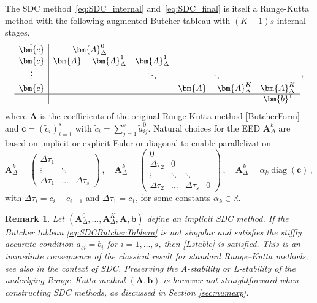 \documentclass[sn-mathphys-num]{sn-jnl}%
\newcommand{\revc}[1]{#1}%
\DeclareMathOperator{\diag}{diag}
\theoremstyle{thmstyleone}%
\theoremstyle{thmstyletwo}%
\newtheorem{remark}{Remark}%
\theoremstyle{thmstylethree}%
\begin{document}
The SDC method~\eqref{eq:SDC_internal} and~\eqref{eq:SDC_final} is itself a Runge-Kutta method with the following augmented Butcher tableau with $(K+1)s$ internal stages,
\begin{equation}
        \label{eq:SDCButcherTableau}
\begin{array}
{c|ccccc}
\tilde{\bm{c}}& \bm{A}_{\Delta}^0  &  &     &  \\
\bm{c}& \bm{A}-\bm{A}_{\Delta}^1 & \bm{A}_{\Delta}^1 &   &  \\
\vdots&     & \ddots & \ddots &   \\
\bm{c} & &    & \bm{A}-\bm{A}_{\Delta}^K & \bm{A}_{\Delta}^K \\
\hline
&  &  &   & \bm{b}^\intercal 
\end{array} \,,
\end{equation}
where $\bm{A}$ is the coefficients of the original Runge-Kutta method \eqref{ButcherForm} and $\tilde{\bm{c}} = (\tilde{c}_{i})_{i=1}^s$ with $\tilde{c}_i = \sum_{j=1}^s \tilde{a}^0_{ij}$.
Natural choices for the EED $\bm{A}^k_\Delta$ are based on implicit or explicit Euler or diagonal to enable parallelization
\begin{equation}
\label{eq:IEEulerED}
\bm{A}_\Delta^k= \begin{pmatrix}
\Delta\tau_1 \\
\vdots & \ddots & \\
\Delta\tau_1 & \dots & \Delta\tau_{s} 
\end{pmatrix}\,,%
\quad
\bm{A}_\Delta^k = \begin{pmatrix}
0 & \\
\Delta\tau_2 &  0\\
\vdots & \ddots & \ddots\\
\Delta\tau_2 & \dots & \Delta\tau_{s} & 0
\end{pmatrix} \,,
\quad
\bm{A}_\Delta^k = \alpha_k \diag(\bm{c}) \,,
\end{equation} 
with $\Delta \tau_i = c_{i} - c_{i-1}$ and $\Delta \tau_1  = c_{1}$, for some constants $\alpha_k \in \mathbb{R}$.

\begin{remark}
    \revc{Let $(\bm{A}_\Delta^0, \ldots, \bm{A}^K_\Delta, \bm{A}, \bm{b})$ define an implicit SDC method. If the Butcher tableau \eqref{eq:SDCButcherTableau} is not singular and satisfies the stiffly accurate condition $a_{si} = b_i$ for $i=1,\dots,s$, then \eqref{Lstable} is satisfied. This is an immediate consequence of the classical result \cite[Prop. 3.8]{HairerEtAl1996_stiff} for standard Runge--Kutta methods, see also \citep{VanDerHouwen1991} in the context of SDC.
    Preserving the A-stability or L-stability of the underlying Runge--Kutta method $(\bm{A}, \bm{b})$ is however not straightforward when constructing SDC methods, as discussed in Section \ref{sec:numexp}.}
\end{remark}
\end{document}

